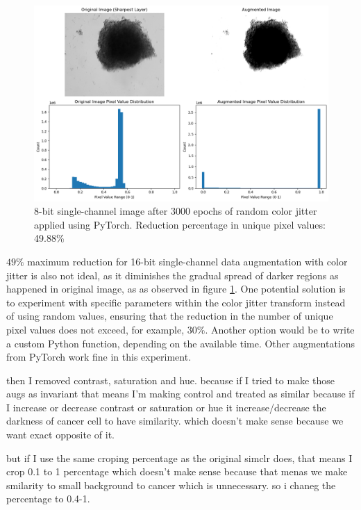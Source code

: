   \begin{figure}[H]
    \centering
    \includegraphics[scale=0.5]{figures/16bit_onen.png} 
    \caption{8-bit single-channel image after 3000 epochs of random color jitter applied using PyTorch. Reduction percentage in unique pixel values: 49.88\%}
    \label{fig:16bit_single_channel}
  \end{figure}

  $49\%$ maximum reduction for 16-bit single-channel data augmentation with color jitter is also not ideal, as it diminishes the gradual spread of 
  darker regions 
as happened in original image, as  as observed in figure \ref{fig:16bit_single_channel}. One potential solution is to experiment with specific parameters
 within the color 
jitter transform instead of using random values, ensuring that the reduction in the number of unique pixel values does not exceed, for example, $30\%$. 
Another 
option would be to write a custom Python function, depending on the available time. Other augmentations from PyTorch work fine in this experiment.

then I removed contrast, saturation and hue. because if I tried to make 
those augs as invariant that means I'm making control and treated as 
similar because if I increase or decrease contrast or 
saturation or hue it increase/decrease the darkness of cancer cell to 
have similarity.
which doesn't make sense because we want exact opposite of it.

but if I use the same croping percentage as the original simclr does, 
that means I crop 0.1  to 1 percentage which doesn't make sense because that 
menas we make smilarity to small background to cancer which is unnecessary. 
so i chaneg the percentage to 0.4-1.

